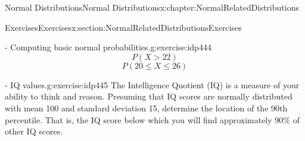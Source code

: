 \documentclass[oneside,10pt,]{book}
\numberwithin{equation}{section}
\newcommand{\gt}{>}
\begin{document}
\begin{chapterptx}{Normal Distributions}{}{Normal Distributions}{}{}{x:chapter:NormalRelatedDistributions}
\begin{sectionptx}{Exercises}{}{Exercises}{}{}{x:section:NormalRelatedDistributionsExercises}
\begin{inlineexercise}{- Computing basic normal probabilities.}{g:exercise:idp444}
\begin{equation*}
\end{equation*}
%
\begin{equation*}
P( X \gt 22)
\end{equation*}
%
\begin{equation*}
P( 20 \le X \le 26)
\end{equation*}
%
\end{inlineexercise}%
\begin{inlineexercise}{- IQ values.}{g:exercise:idp445}%
The Intelligence Quotient (IQ) is a measure of your ability to think and reason. Presuming that IQ scores are normally distributed with mean 100 and standard deviation 15, determine the location of the 90th percentile.  That is, the IQ score below which you will find approximately 90\% of other IQ scores.%
\end{inlineexercise}%
\end{sectionptx}
\end{chapterptx}
%
%
\typeout{************************************************}
\typeout{************************************************}
%
\end{document}

